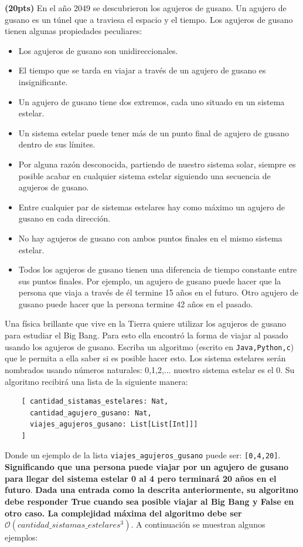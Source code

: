 \documentclass[12pt, a4paper]{exam}
\begin{document}
\begin{questions}
	\pointsdroppedatright
	\question \textbf{(20pts)} En el año 2049 se descubrieron los agujeros de gusano. Un agujero de gusano es un túnel que a traviesa el espacio y el tiempo. Los agujeros de gusano tienen algunas propiedades peculiares:
     \begin{itemize}
         \item Los agujeros de gusano son unidireccionales.
         \item El tiempo que se tarda en viajar a través de un agujero de gusano es insignificante.
         \item Un agujero de gusano tiene dos extremos, cada uno situado en un sistema estelar.
         \item Un sistema estelar puede tener más de un punto final de agujero de gusano dentro de sus límites.
         \item Por alguna razón desconocida, partiendo de nuestro sistema solar, siempre es posible acabar en cualquier sistema estelar siguiendo una secuencia de agujeros de gusano.
         \item Entre cualquier par de sistemas estelares hay como máximo un agujero de gusano en cada dirección.
         \item No hay agujeros de gusano con ambos puntos finales en el mismo sistema estelar.
         \item Todos los agujeros de gusano tienen una diferencia de tiempo constante entre sus puntos finales. Por ejemplo, un agujero de gusano puede hacer que la persona que viaja a través de él termine 15 años en el futuro. Otro agujero de gusano puede hacer que la persona termine 42 años en el pasado.
     \end{itemize}
    Una física brillante que vive en la Tierra quiere utilizar los agujeros de gusano para estudiar el Big Bang. Para esto ella encontró la forma de viajar al pasado usando los agujeros de gusano. Escriba un algoritmo (escrito en \verb|Java,Python,c|) que le permita a ella saber si es posible hacer esto. Los sistema estelares serán nombrados usando números naturales: 0,1,2,... nuestro sistema estelar es el 0. Su algoritmo recibirá una lista de la siguiente manera: 
    \begin{verbatim}
    [ cantidad_sistamas_estelares: Nat, 
      cantidad_agujero_gusano: Nat, 
      viajes_agujeros_gusano: List[List[Int]]]
    ]
    \end{verbatim}
    Donde un ejemplo de la lista \verb|viajes_agujeros_gusano| puede ser: \verb|[0,4,20]|. \textbf{Significando que una persona puede viajar por un agujero de gusano para llegar del sistema estelar 0 al 4 pero terminará 20 años en el futuro}. \textbf{Dada una entrada como la descrita anteriormente, su algoritmo debe responder True cuando sea posible viajar al Big Bang y False en otro caso. La complejidad máxima del algoritmo debe ser $\mathcal{O}(cantidad\_sistamas\_estelares^3)$}. A continuación se muestran algunos ejemplos:


\end{questions}
\end{document}
